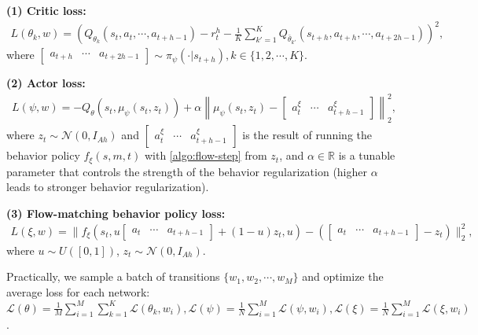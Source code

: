 \textbf{(1) Critic loss:}
\begin{align}
    L(\theta_k, w) = \left(Q_{\theta_k}(s_t, a_t, \cdots, a_{t+h-1}) - r^h_t - \frac{1}{K}\sum_{k'=1}^{K} Q_{\bar \theta_{k'}}(s_{t+h}, a_{t+h}, \cdots, a_{t+2h-1})\right)^2, 
\end{align}
where $\begin{bmatrix} a_{t+h} & \cdots & a_{t+2h-1} \end{bmatrix} \sim \pi_\psi(\cdot | s_{t+h}), k \in \{1, 2, \cdots, K\}$.

\textbf{(2) Actor loss:}
\begin{align}
    L(\psi, w) = -Q_\theta(s_t, \mu_\psi(s_t, z_t)) + \alpha \left\|\mu_\psi(s_t, z_t) - \begin{bmatrix} a^\xi_t & \cdots & a^\xi_{t+h-1} \end{bmatrix}\right\|_2^2,
\end{align}
where $z_t \sim \mathcal{N}(0, I_{Ah})$ and  $\begin{bmatrix} a^\xi_t & \cdots & a^\xi_{t+h-1} \end{bmatrix}$ is the result of running the behavior policy $f_\xi(s, m, t)$ with \cref{algo:flow-step} from $z_t$, and $\alpha \in \mathbb{R}$ is a tunable parameter that controls the strength of the behavior regularization (higher $\alpha$ leads to stronger behavior regularization).

\textbf{(3) Flow-matching behavior policy loss:}
\begin{align}
    L(\xi, w) = \|f_\xi(s_t, u\begin{bmatrix} a_t & \cdots & a_{t+h-1} \end{bmatrix} + (1-u)z_t, u) - (\begin{bmatrix} a_t & \cdots & a_{t+h-1} \end{bmatrix} - z_t)\|_2^2,
    \label{eq:fql-flow}
\end{align}
where $u \sim U([0, 1])$, $z_t \sim \mathcal{N}(0, I_{Ah})$.

Practically, we sample a batch of transitions $\{w_1, w_2, \cdots, w_M\}$ and optimize the average loss for each network: $\mathcal{L}(\theta) = \frac{1}{M}\sum_{i=1}^M \sum_{k=1}^K \mathcal{L}(\theta_k, w_i), \mathcal{L}(\psi) = \frac{1}{N}\sum_{i=1}^M  \mathcal{L}(\psi, w_i), \mathcal{L}(\xi) = \frac{1}{N}\sum_{i=1}^M \mathcal{L}(\xi, w_i)$.

